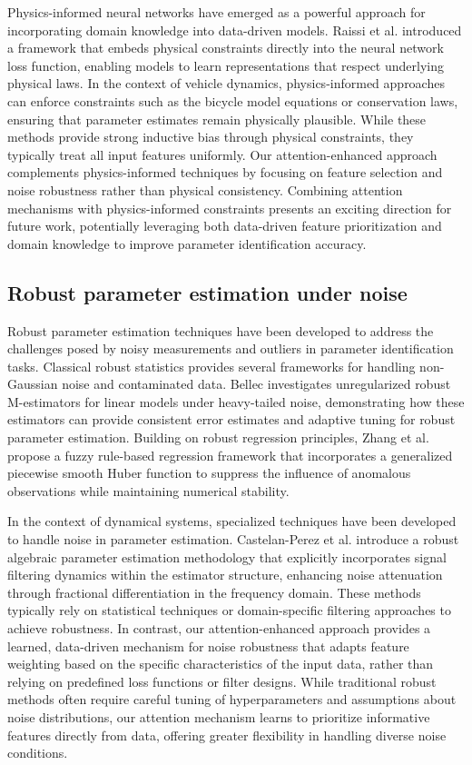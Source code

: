 \documentclass[Afour,sageh,times]{sagej}
\begin{document}
Physics-informed neural networks have emerged as a powerful approach for incorporating domain knowledge into data-driven models. Raissi et al. \citep{Raissi2019PhysicsinformedNN} introduced a framework that embeds physical constraints directly into the neural network loss function, enabling models to learn representations that respect underlying physical laws. In the context of vehicle dynamics, physics-informed approaches can enforce constraints such as the bicycle model equations or conservation laws, ensuring that parameter estimates remain physically plausible. While these methods provide strong inductive bias through physical constraints, they typically treat all input features uniformly. Our attention-enhanced approach complements physics-informed techniques by focusing on feature selection and noise robustness rather than physical consistency. Combining attention mechanisms with physics-informed constraints presents an exciting direction for future work, potentially leveraging both data-driven feature prioritization and domain knowledge to improve parameter identification accuracy.

\subsection{Robust parameter estimation under noise}
\label{sec:robust_estimation}

Robust parameter estimation techniques have been developed to address the challenges posed by noisy measurements and outliers in parameter identification tasks. Classical robust statistics provides several frameworks for handling non-Gaussian noise and contaminated data. Bellec \citep{Bellec2023ErrorEA} investigates unregularized robust M-estimators for linear models under heavy-tailed noise, demonstrating how these estimators can provide consistent error estimates and adaptive tuning for robust parameter estimation. Building on robust regression principles, Zhang et al. \citep{Zhang2025ARF} propose a fuzzy rule-based regression framework that incorporates a generalized piecewise smooth Huber function to suppress the influence of anomalous observations while maintaining numerical stability.

In the context of dynamical systems, specialized techniques have been developed to handle noise in parameter estimation. Castelan-Perez et al. \citep{CastelanPerez2025FilteringAF} introduce a robust algebraic parameter estimation methodology that explicitly incorporates signal filtering dynamics within the estimator structure, enhancing noise attenuation through fractional differentiation in the frequency domain. These methods typically rely on statistical techniques or domain-specific filtering approaches to achieve robustness. In contrast, our attention-enhanced approach provides a learned, data-driven mechanism for noise robustness that adapts feature weighting based on the specific characteristics of the input data, rather than relying on predefined loss functions or filter designs. While traditional robust methods often require careful tuning of hyperparameters and assumptions about noise distributions, our attention mechanism learns to prioritize informative features directly from data, offering greater flexibility in handling diverse noise conditions.
\end{document}
